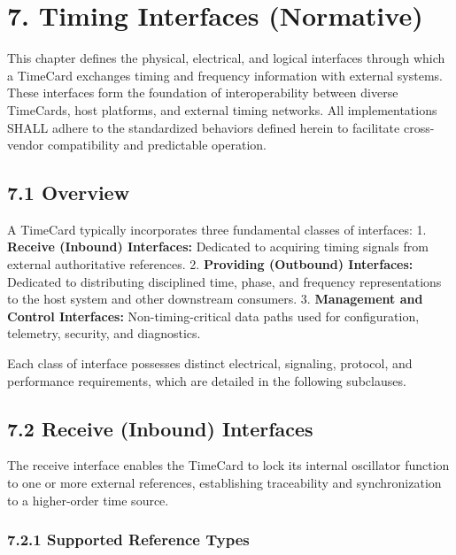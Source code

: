 \section{7. Timing Interfaces
(Normative)}\label{timing-interfaces-normative}

This chapter defines the physical, electrical, and logical interfaces
through which a TimeCard exchanges timing and frequency information with
external systems. These interfaces form the foundation of
interoperability between diverse TimeCards, host platforms, and external
timing networks. All implementations SHALL adhere to the standardized
behaviors defined herein to facilitate cross-vendor compatibility and
predictable operation.

\subsection{7.1 Overview}\label{overview-1}

A TimeCard typically incorporates three fundamental classes of
interfaces: 1. \textbf{Receive (Inbound) Interfaces:} Dedicated to
acquiring timing signals from external authoritative references. 2.
\textbf{Providing (Outbound) Interfaces:} Dedicated to distributing
disciplined time, phase, and frequency representations to the host
system and other downstream consumers. 3. \textbf{Management and Control
Interfaces:} Non-timing-critical data paths used for configuration,
telemetry, security, and diagnostics.

Each class of interface possesses distinct electrical, signaling,
protocol, and performance requirements, which are detailed in the
following subclauses.

\subsection{7.2 Receive (Inbound)
Interfaces}\label{receive-inbound-interfaces}

The receive interface enables the TimeCard to lock its internal
oscillator function to one or more external references, establishing
traceability and synchronization to a higher-order time source.

\subsubsection{7.2.1 Supported Reference
Types}\label{supported-reference-types}


